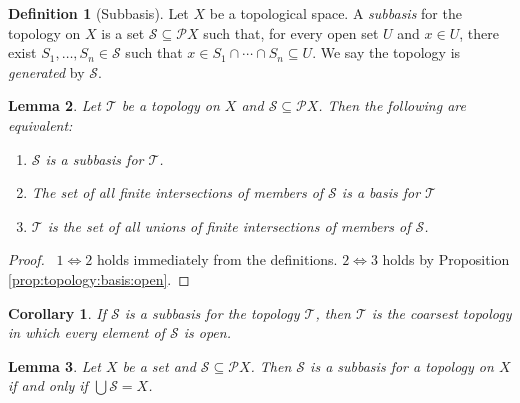 \documentclass{report}
\let\qed\relax
\newtheorem{lm}{Lemma}[section]
\newtheorem{cor}{Corollary}[lm]
\theoremstyle{definition}
\newtheorem{df}[lm]{Definition}
\begin{document}
  \begin{df}[Subbasis]
    Let $X$ be a topological space. A \emph{subbasis} for the topology on $X$
    is
    a set $\mathcal{S} \subseteq \mathcal{P} X$ such that, for every open set
    $U$
    and $x \in U$, there exist $S_1, \ldots, S_n \in \mathcal{S}$ such that $x
    \in S_1 \cap \cdots \cap S_n \subseteq U$. We say the topology is
    \emph{generated} by $\mathcal{S}$.
  \end{df}

  \begin{lm}
    \label{lm:topology:subbasis:generate}
    Let $\mathcal{T}$ be a topology on $X$ and $\mathcal{S}
    \subseteq \mathcal{P} X$.   Then the following are equivalent:
    \begin{enumerate}
      \item $\mathcal{S}$ is a subbasis for $\mathcal{T}$.
      \item The set of all finite intersections of members of $\mathcal{S}$ is
      a
      basis for $\mathcal{T}$
      \item $\mathcal{T}$ is the set of all unions of finite intersections of
      members of $\mathcal{S}$.
    \end{enumerate}
  \end{lm}

  \begin{proof}
    \pf\ $1 \Leftrightarrow 2$ holds immediately from the definitions. $2
    \Leftrightarrow 3$ holds by Proposition \ref{prop:topology:basis:open}. \qed
  \end{proof}

  \begin{cor}
    \label{cor:topology:subbasis:coarsest}
    If $\mathcal{S}$ is a subbasis for the topology $\mathcal{T}$, then
    $\mathcal{T}$ is the coarsest topology in which every element of
    $\mathcal{S}$ is open.
  \end{cor}

  \begin{lm}
    Let $X$ be a set and $\mathcal{S} \subseteq \mathcal{P} X$. Then
    $\mathcal{S}$ is a subbasis for a topology on $X$ if and only if $\bigcup
    \mathcal{S} = X$.
  \end{lm}
\end{document}
